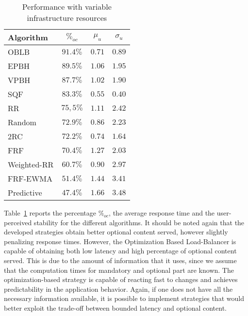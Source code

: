\begin{table}
\centering
\caption{Performance with variable infrastructure resources}
\label{tab:resourcechanges-performance}
\begin{tabular}{l c c c}
\hline
Algorithm   & $\%_{oc}$ & $\mu_u$ & $\sigma_u$ \\
\hline
OBLB        & $\mathbf{91.4\%}$ & $0.71$          & $0.89$ \\
EPBH        & $89.5\%$          & $1.06$          & $1.95$ \\
VPBH        & $87.7\%$          & $1.02$          & $1.90$ \\
SQF         & $83.3\%$          & $\mathbf{0.55}$ & $\mathbf{0.40}$ \\
RR          & $75,5\%$          & $1.11$          & $2.42$ \\
Random      & $72.9\%$          & $0.86$          & $2.23$ \\
2RC         & $72.2\%$          & $0.74$          & $1.64$ \\
FRF         & $70.4\%$          & $1.27$          & $2.03$ \\
Weighted-RR & $60.7\%$          & $0.90$          & $2.97$ \\
FRF-EWMA    & $51.4\%$          & $1.44$          & $3.41$ \\
Predictive  & $47.4\%$          & $1.66$          & $3.48$ \\
\hline
\end{tabular}
\end{table}

Table~\ref{tab:resourcechanges-performance} reports the percentage
$\%_{oc}$, the average response time and the user-perceived stability
for the different algorithms. It should be noted again that the
developed strategies obtain better optional content served, however
slightly penalizing response times. However, the Optimization Based
Load-Balancer is capable of obtaining both low latency and high
percentage of optional content served. This is due to the amount of
information that it uses, since we assume that the computation times
for mandatory and optional part are known. The optimization-based
strategy is capable of reacting fast to changes and achieves
predictability in the application behavior. Again, if one does not
have all the necessary information available, it is possible to
implement strategies that would better exploit the trade-off between
bounded latency and optional content.
